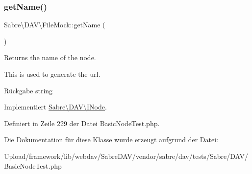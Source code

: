 \subsubsection{\texorpdfstring{get\+Name()}{getName()}}
{\footnotesize\ttfamily Sabre\textbackslash{}\+D\+A\+V\textbackslash{}\+File\+Mock\+::get\+Name (\begin{DoxyParamCaption}{ }\end{DoxyParamCaption})}

Returns the name of the node.

This is used to generate the url.

\begin{DoxyReturn}{Rückgabe}
string 
\end{DoxyReturn}


Implementiert \mbox{\hyperlink{interface_sabre_1_1_d_a_v_1_1_i_node_ab616fe836b1ae36af12126a2bc934dce}{Sabre\textbackslash{}\+D\+A\+V\textbackslash{}\+I\+Node}}.



Definiert in Zeile 229 der Datei Basic\+Node\+Test.\+php.



Die Dokumentation für diese Klasse wurde erzeugt aufgrund der Datei\+:\begin{DoxyCompactItemize}
\item 
Upload/framework/lib/webdav/\+Sabre\+D\+A\+V/vendor/sabre/dav/tests/\+Sabre/\+D\+A\+V/Basic\+Node\+Test.\+php\end{DoxyCompactItemize}
